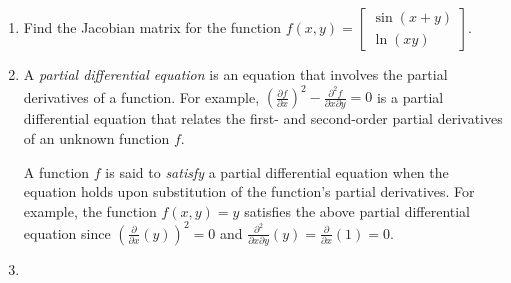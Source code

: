 \documentclass{article}
\begin{document}
\begin{enumerate}
\item

Find the Jacobian matrix for the function
$f(x,y) = \begin{bmatrix} \sin(x+y) \\ \ln(xy) \end{bmatrix}$.

\item
{}

A \emph{partial differential equation} is an equation that involves
the partial derivatives of a function.  For example, 
$(\frac{\partial f}{\partial x})^2 - \frac{\partial^2 f}{\partial x 
\partial y} = 0$ is a partial differential equation that relates
the first- and second-order partial derivatives of an unknown function 
$f$.

A function $f$ is said to \emph{satisfy} a partial differential
equation when the equation holds upon substitution of the function's
partial derivatives.  For example, the function $f(x, y) = y$ 
satisfies the above partial differential equation since
$(\frac{\partial}{\partial x}(y))^2 = 0$ and $\frac{\partial^2}{\partial x \partial y}(y) = \frac{\partial}{\partial x}(1) = 0$.

\item
{}

\end{enumerate}


\newpage
\end{document}
